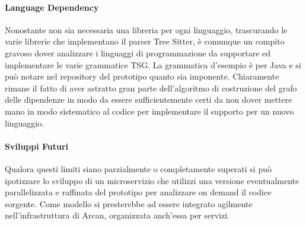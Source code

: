 \paragraph{Language Dependency}

Nonostante non sia necessaria una libreria per ogni linguaggio, trascurando le varie librerie che implementano il parser Tree Sitter, \`e comunque un compito gravoso dover analizzare i linguaggi di programmazione da supportare ed implementare le varie grammatice TSG. La grammatica d'esempio \`e per Java e si pu\`o notare nel repository del prototipo quanto sia imponente. Chiaramente rimane il fatto di aver astratto gran parte dell'algoritmo di costruzione del grafo delle dipendenze in modo da essere sufficientemente certi da non dover mettere mano in modo sistematico al codice per implementare il supporto per un nuovo linguaggio.

\paragraph{Sviluppi Futuri}

Qualora questi limiti siano parzialmente o completamente superati si pu\`o ipotizzare lo sviluppo di un microservizio che utilizzi una versione eventualmente parallelizzata e raffinata del prototipo per analizzare on demand il codice sorgente. Come modello si presterebbe ad essere integrato agilmente nell'infrastruttura di Arcan, organizzata anch'essa per servizi.
